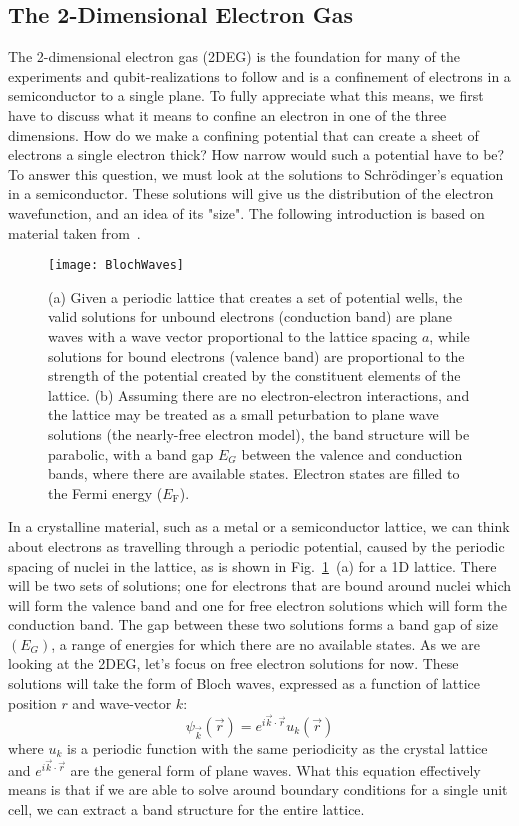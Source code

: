 \subsection{The 2-Dimensional Electron Gas}
\label{sec:2deg}
The 2-dimensional electron gas (2DEG) is the foundation for many of the experiments and qubit-realizations to follow and
is a confinement of electrons in a semiconductor to a single plane. To fully
appreciate what this means, we first have to discuss what it means to confine an electron in one of the three dimensions.
How do we make a confining potential that can create a sheet of electrons a single electron thick? How narrow
would such a potential have to be? To answer this question, we must look at the solutions
to Schrödinger's equation in a semiconductor. These solutions will give us the distribution of the electron wavefunction, and
an idea of its "size". The following introduction is based on material taken from~\cite{delftbook, ihnbook, Ashcroft}.

\begin{figure}
  \texttt{[image: BlochWaves]}
  \caption[Bloch Waves on a regular lattice]
  {(a) Given a periodic lattice that creates a set of potential wells, the valid solutions for unbound
   electrons (conduction band) are plane waves with a wave vector proportional to the lattice spacing $a$,
   while solutions for bound electrons (valence band) are proportional to the strength of the potential created
   by the constituent elements of the lattice. (b) Assuming there are no electron-electron interactions,
   and the lattice may be treated as a small peturbation to plane wave solutions (the nearly-free electron model),
   the band structure will be parabolic, with a band gap $E_G$ between the valence and conduction bands, where there are
   available states. Electron states are filled to the Fermi energy ($E_\textrm{F}$).}
  \label{fig:blochwaves}
\end{figure}

In a crystalline material, such as a metal or a semiconductor lattice, we can think
about electrons as travelling through a periodic potential, caused by the periodic spacing of nuclei in the lattice, as
is shown in Fig.~\ref{fig:blochwaves}~(a) for a 1D lattice. There will be two sets of solutions; one for electrons
that are bound around nuclei which will form the valence band and one for free electron solutions which
will form the conduction band. The gap between these two solutions forms a band gap of size $(E_G)$, a range
of energies for which there are no available states. As we are looking at the 2DEG, let's focus on free electron solutions for now.
These solutions will take the form of Bloch waves, expressed as a function of lattice position $r$ and wave-vector $k$:
\begin{equation}
  \psi_{\vec{k}}(\vec{r}) = e^{i\vec{k} \cdot \vec{r}}u_k(\vec{r})
\end{equation}
where $u_k$ is a periodic function with the same periodicity as the crystal lattice and $e^{i\vec{k} \cdot \vec{r}}$ are
the general form of plane waves. What this equation effectively means is that if we are able to solve around boundary conditions for
a single unit cell, we can extract a band structure for the entire lattice.

